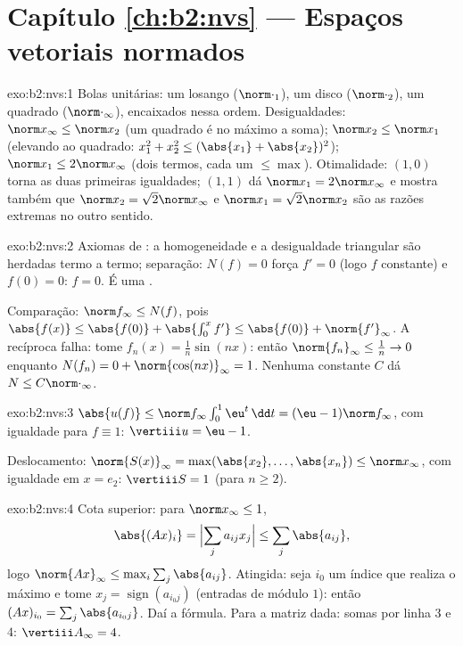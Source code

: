 \section*{Capítulo \ref{ch:b2:nvs} --- Espaços vetoriais normados}

\begin{solution}{exo:b2:nvs:1}
Bolas unitárias: um losango ($\norm\cdot_1$), um disco ($\norm\cdot_2$), um
quadrado ($\norm\cdot_\infty$), encaixados nessa ordem. Desigualdades:
$\norm x_\infty \leq \norm x_2$ (um quadrado é no máximo a soma);
$\norm x_2 \leq \norm x_1$ (elevando ao quadrado: $x_1^2 + x_2^2 \leq (\abs{x_1}
+ \abs{x_2})^2$); $\norm x_1 \leq 2\norm x_\infty$ (dois termos, cada um
$\leq \max$). Otimalidade: $(1, 0)$ torna as duas primeiras igualdades;
$(1, 1)$ dá $\norm x_1 = 2\norm x_\infty$ e mostra também que
$\norm x_2 = \sqrt2 \norm x_\infty$ e $\norm x_1 = \sqrt2 \norm
x_2$ são as razões extremas no outro sentido.
\end{solution}

\begin{solution}{exo:b2:nvs:2}
Axiomas de : a homogeneidade e a desigualdade triangular são herdadas
termo a termo; separação: $N(f) = 0$ força $f' = 0$ (logo $f$ constante)
e $f(0) = 0$: $f = 0$. É uma .

Comparação: $\norm f_\infty \leq N(f)$, pois $\abs{f(x)} \leq
\abs{f(0)} + \abs{\int_0^x f'} \leq \abs{f(0)} +
\norm{f'}_\infty$. A recíproca falha: tome $f_n(x) = \frac1n
\sin(nx)$: então $\norm{f_n}_\infty \leq \frac1n \to 0$ enquanto
$N(f_n) = 0 + \norm{\cos(nx)}_\infty = 1$. Nenhuma constante $C$ dá
$N \leq C\norm\cdot_\infty$.
\end{solution}

\begin{solution}{exo:b2:nvs:3}
$\abs{u(f)} \leq \norm f_\infty \int_0^1 \eu^t\,\dd t = (\eu -
1)\norm f_\infty$, com igualdade para $f \equiv 1$: $\vertiii u =
\eu - 1$.

Deslocamento: $\norm{S(x)}_\infty = \max(\abs{x_2}, \dots, \abs{x_n}) \leq
\norm x_\infty$, com igualdade em $x = e_2$: $\vertiii S = 1$ (para $n
\geq 2$).
\end{solution}

\begin{solution}{exo:b2:nvs:4}
Cota superior: para $\norm x_\infty \leq 1$,
\[
\abs{(Ax)_i} = \Bigl|\sum_j a_{ij}x_j\Bigr| \leq \sum_j
\abs{a_{ij}},
\]
logo $\norm{Ax}_\infty \leq \max_i \sum_j \abs{a_{ij}}$. Atingida: seja
$i_0$ um índice que realiza o máximo e tome $x_j = \operatorname{sign}(a_{i_0
j})$ (entradas de módulo $1$): então $(Ax)_{i_0} = \sum_j \abs{a_{i_0
j}}$. Daí a fórmula. Para a matriz dada: somas por linha $3$ e
$4$: $\vertiii A_\infty = 4$.
\end{solution}

